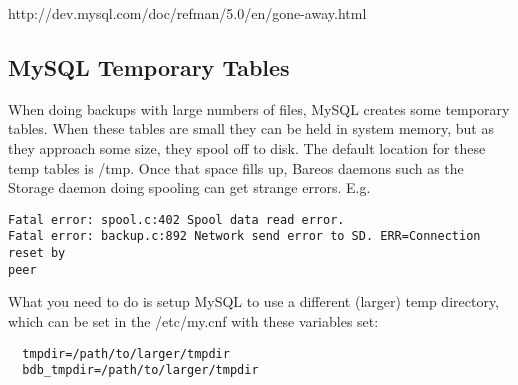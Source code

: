{http://dev.mysql.com/doc/refman/5.0/en/gone-away.html}

\subsection{MySQL Temporary Tables}
When doing backups with large numbers of files, MySQL creates some
temporary tables.  When these tables are small they can be held in
system memory, but as they approach some size, they
spool off to disk.  The default location for these temp tables is
/tmp.  Once that space fills up, Bareos daemons such as the Storage
daemon doing spooling can get strange errors. E.g.

\footnotesize
\begin{verbatim}
Fatal error: spool.c:402 Spool data read error.
Fatal error: backup.c:892 Network send error to SD. ERR=Connection reset by
peer
\end{verbatim}
\normalsize

What you need to do is setup MySQL to use a different (larger) temp
directory, which can be set in the /etc/my.cnf with these variables
set:

\footnotesize
\begin{verbatim}
  tmpdir=/path/to/larger/tmpdir
  bdb_tmpdir=/path/to/larger/tmpdir
\end{verbatim}
\normalsize




